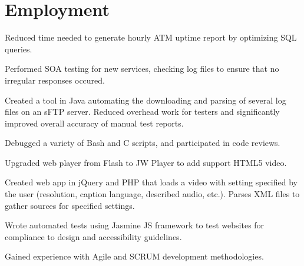 \documentclass[]{deedy-resume-openfont}
\begin{document}
\begin{minipage}[t]{0.66\textwidth} 


\section{Employment}

\vspace{\topsep} %
\begin{tightemize}
\item Reduced time needed to generate hourly ATM uptime report by optimizing SQL queries.   
\item Performed SOA testing for new services, checking log files to ensure that no irregular responses occured.
\item Created a tool in Java automating the downloading and parsing of several log files on an sFTP server. Reduced overhead work for testers and significantly improved overall accuracy of manual test reports. %
\item Debugged a variety of Bash and C scripts, and participated in code reviews.
\end{tightemize}
\sectionsep

\begin{tightemize}
\item Upgraded web player from Flash to JW Player to add support HTML5 video.
\item Created web app in jQuery and PHP that loads a video with setting specified by the user (resolution, caption language, described audio, etc.). Parses XML files to gather sources for specified settings.
\item Wrote automated tests using Jasmine JS framework to test websites for compliance to design and accessibility guidelines.
\item Gained experience with Agile and SCRUM development methodologies.
\end{tightemize}
\sectionsep


\end{minipage}
\end{document}
